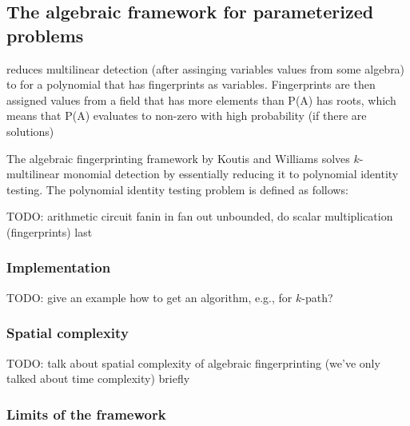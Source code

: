 \subsection{The algebraic framework for parameterized problems}

\cite{Williams09} reduces multilinear detection (after assinging variables values from some algebra) 
to
for a polynomial
 that has fingerprints as variables. 
Fingerprints are then assigned values from a field that has more elements than P(A) has roots, which 
means that P(A) evaluates to non-zero with high probability (if there are solutions)

The algebraic fingerprinting framework by Koutis and Williams  
solves $k$-multilinear monomial detection by essentially reducing it to 
polynomial identity testing. The polynomial identity testing problem is defined 
as follows:

\begin{problem}
\end{problem}


TODO: arithmetic circuit fanin in fan out unbounded, do scalar multiplication (fingerprints) last

\subsubsection{Implementation}

TODO: give an example how to get an algorithm, e.g., for $k$-path?

\subsubsection{Spatial complexity}
\label{sect:spatial_complexity}

TODO: talk about spatial complexity of algebraic fingerprinting (we've only talked about time complexity) 
briefly

\subsubsection{Limits of the framework}
\label{sect:limits}

